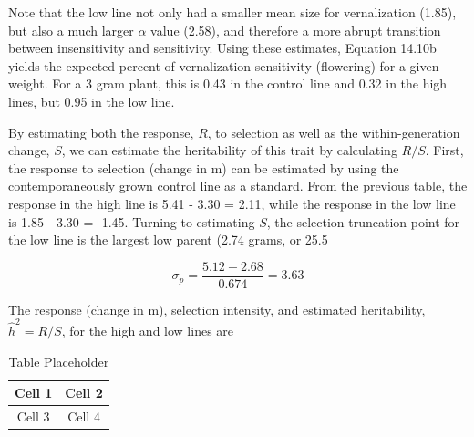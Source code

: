 \documentclass{article}
\begin{document}
Note that the low line not only had a smaller mean size for vernalization (1.85), but also a much larger  $ \alpha $ value (2.58), and therefore a more abrupt transition between insensitivity and sensitivity. Using these estimates, Equation 14.10b yields the expected percent of vernalization sensitivity (flowering) for a given weight. For a 3 gram plant, this is 0.43 in the control line and 0.32 in the high lines, but 0.95 in the low line.

By estimating both the response,  $ R $, to selection as well as the within-generation change,  $ S $, we can estimate the heritability of this trait by calculating  $ R/S $. First, the response to selection (change in m) can be estimated by using the contemporaneously grown control line as a standard. From the previous table, the response in the high line is 5.41 - 3.30 = 2.11, while the response in the low line is 1.85 - 3.30 = -1.45. Turning to estimating  $ S $, the selection truncation point for the low line is the largest low parent (2.74 grams, or 25.5%

\begin{equation}
\sigma_{p}=\frac{5.12-2.68}{0.674}=3.63
\end{equation}

The response (change in m), selection intensity, and estimated heritability,  $ \hat{h}^{2} = R/S $, for the high and low lines are

\begin{table}[h]
\centering
\begin{tabular}{|c|c|}
\hline
Cell 1 & Cell 2 \\
\hline
Cell 3 & Cell 4 \\
\hline
\end{tabular}
\caption{Table Placeholder}
\end{table}
\end{document}
